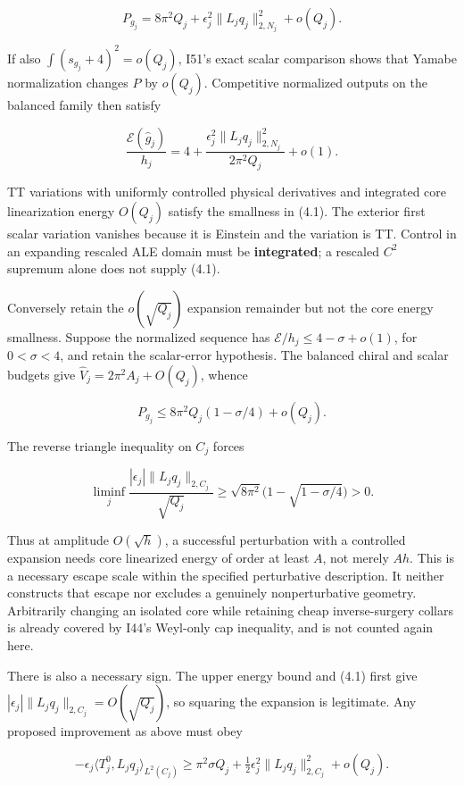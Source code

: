 \documentclass[
  11pt,
]{article}
\begin{document}
\[
 P_{g_j}=8\pi^2Q_j+
       \epsilon_j^2\|L_jq_j\|_{2,N_j}^2+o(Q_j). \tag{4.2}
\]

If also \(\int(s_{g_j}+4)^2=o(Q_j)\), I51's exact scalar comparison
shows that Yamabe normalization changes \(P\) by \(o(Q_j)\). Competitive
normalized outputs on the balanced family then satisfy

\[
 \frac{\mathcal E(\widehat g_j)}{h_j}
 =4+\frac{\epsilon_j^2\|L_jq_j\|_{2,N_j}^2}{2\pi^2Q_j}+o(1).
 \tag{4.3}
\]

TT variations with uniformly controlled physical derivatives and
integrated core linearization energy \(O(Q_j)\) satisfy the smallness in
(4.1). The exterior first scalar variation vanishes because it is
Einstein and the variation is TT. Control in an expanding rescaled ALE
domain must be \textbf{integrated}; a rescaled \(C^2\) supremum alone
does not supply (4.1).

Conversely retain the \(o(\sqrt{Q_j})\) expansion remainder but not the
core energy smallness. Suppose the normalized sequence has
\(\mathcal E/h_j\le4-\sigma+o(1)\), for \(0<\sigma<4\), and retain the
scalar-error hypothesis. The balanced chiral and scalar budgets give
\(\widehat V_j=2\pi^2A_j+O(Q_j)\), whence

\[
 P_{g_j}\le 8\pi^2Q_j(1-\sigma/4)+o(Q_j).
\]

The reverse triangle inequality on \(C_j\) forces

\[
 \boxed{\liminf_j
 \frac{|\epsilon_j|\|L_jq_j\|_{2,C_j}}{\sqrt{Q_j}}
 \ge\sqrt{8\pi^2}\bigl(1-\sqrt{1-\sigma/4}\bigr)>0.} \tag{4.4}
\]

Thus at amplitude \(O(\sqrt h)\), a successful perturbation with a
controlled expansion needs core linearized energy of order at least
\(A\), not merely \(Ah\). This is a necessary escape scale within the
specified perturbative description. It neither constructs that escape
nor excludes a genuinely nonperturbative geometry. Arbitrarily changing
an isolated core while retaining cheap inverse-surgery collars is
already covered by I44's Weyl-only cap inequality, and is not counted
again here.

There is also a necessary sign. The upper energy bound and (4.1) first
give \(|\epsilon_j|\|L_jq_j\|_{2,C_j}=O(\sqrt{Q_j})\), so squaring the
expansion is legitimate. Any proposed improvement as above must obey

\[
 -\epsilon_j\langle T_j^0,L_jq_j\rangle_{L^2(C_j)}
 \ge\pi^2\sigma Q_j
        +\tfrac12\epsilon_j^2\|L_jq_j\|_{2,C_j}^2+o(Q_j).
 \tag{4.5}
\]
\end{document}
